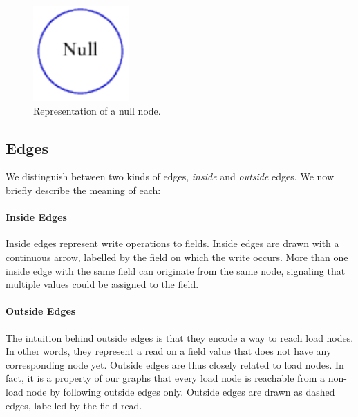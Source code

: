 \begin{figure}[h]
    \centering

    \includegraphics{images/pt_nnodes}

    \caption{Representation of a null node.}
    \label{fig:pt:nnodes}
\end{figure}

\subsection{Edges}
We distinguish between two kinds of edges, \emph{inside} and \emph{outside} edges. We now
briefly describe the meaning of each:

\paragraph{Inside Edges} Inside edges represent write operations to
fields. Inside edges are drawn with a continuous arrow, labelled by the field on
which the write occurs. More than one inside edge with the same field can
originate from the same node, signaling that multiple values could be assigned to the field.

\paragraph{Outside Edges} The intuition behind outside edges is that they
encode a way to reach load nodes. In other words, they represent a read on a
field value that does not have any corresponding node yet.  Outside edges are
thus closely related to load nodes. In fact, it is a property of our graphs
that every load node is reachable from a non-load node by following outside
edges only. Outside edges are drawn as dashed edges, labelled by the field
read.

